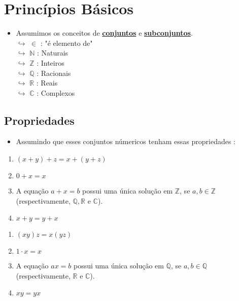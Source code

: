 \section{Princípios Básicos}

    \begin{itemize}[left=0.5cm, align=left, nosep]
        \item Assumimos os conceitos de \underline{\textbf{conjuntos}} e \underline{\textbf{subconjuntos}}. \\
        $\hookrightarrow$ $\in$ : "é elemento de" \\
        $\hookrightarrow$ $\mathbb{N}$ : Naturais \\
        $\hookrightarrow$ $\mathbb{Z}$ : Inteiros \\
        $\hookrightarrow$ $\mathbb{Q}$ : Racionais \\
        $\hookrightarrow$ $\mathbb{R}$ : Reais \\
        $\hookrightarrow$ $\mathbb{C}$ : Complexos 
    \end{itemize} 

    \subsection{Propriedades}

        \begin{itemize}
            \item Assumindo que esses conjuntos númericos tenham essas propriedades :  
        \end{itemize}

        \begin{enumerate}[label=\textbf{A\arabic*.}, align=left, leftmargin=2cm, nosep]
            \item $(x + y) + z = x + (y + z)$
            \item $0 + x = x$
            \item A equação $a + x = b$ possui uma única solução em $\mathbb{Z}$, se $a,b \in \mathbb{Z}$ (respectivamente, $\mathbb{Q},\mathbb{R}$ e $\mathbb{C}$).
            \item $x + y = y + x$
        \end{enumerate}

        \begin{enumerate}[label=\textbf{M\arabic*.}, align=left, leftmargin=2cm, nosep]
            \item $(xy)z = x (yz)$
            \item $1 \cdot x = x$
            \item A equação $ax = b$ possui uma única solução em $\mathbb{Q}$, se $a,b \in \mathbb{Q}$ (respectivamente, $\mathbb{R}$ e $\mathbb{C}$).
            \item $xy = yx$
        \end{enumerate}

